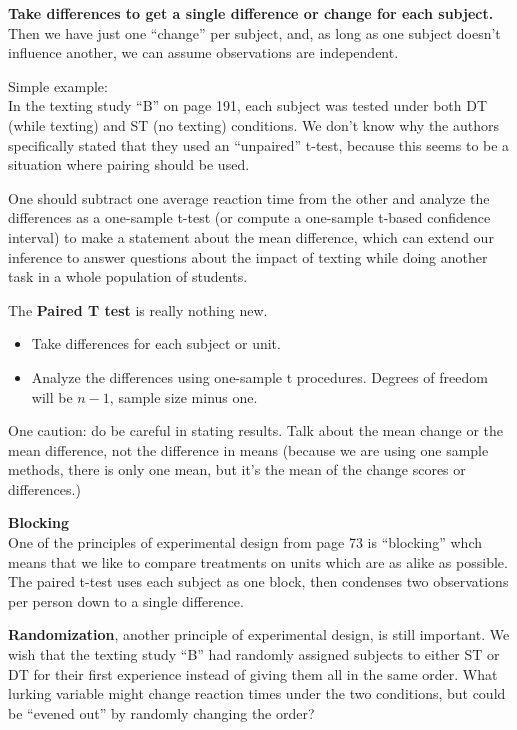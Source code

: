 {\bf Take differences to get a single difference or change for each
  subject.} Then we have just one ``change'' per subject, and, as long
as one subject doesn't influence another, we can assume observations
are independent.  


Simple example:\\
  In the texting study ``B'' on page 191, each subject was tested
  under both DT (while texting) and ST (no texting) conditions.  We
  don't know why the authors specifically stated that they used an
  ``unpaired'' t-test, because this seems to be a situation where
  pairing should be used.  

  One should subtract one average reaction time from the other and
  analyze the differences as a one-sample t-test (or compute a
  one-sample t-based confidence interval) to make a statement about
  the mean difference, which can extend our inference to answer
  questions about the impact of texting while doing another task in a
  whole population of students.\vspace{.4cm}

The {\bf Paired T test} is really nothing new. 
\begin{itemize}
\item Take differences for each subject or unit.
\item Analyze the differences using one-sample t procedures. Degrees
  of freedom will be $n-1$, sample size minus one.
\end{itemize}
One caution: do be careful in stating results. 
Talk about the mean change or the mean difference, not the difference
in means (because we are using one sample methods, there is only one
mean, but it's the mean of the change scores or differences.)


{\bf Blocking}\\
  One of the principles of experimental design from page 73 is
  ``blocking'' whch means that we like to compare treatments on units
  which are as alike as possible.  The paired t-test uses each subject
  as one block, then condenses two observations per person down to a
  single difference.
 
{\bf Randomization}, another principle of experimental design, is
still important.  We wish that the texting study ``B'' had randomly
assigned  subjects to either ST or DT for their first experience
 instead of giving them all in the same order.  What lurking
variable  might change reaction times under the two conditions, but
could be ``evened out'' by randomly changing the order?\vspace{1cm}

